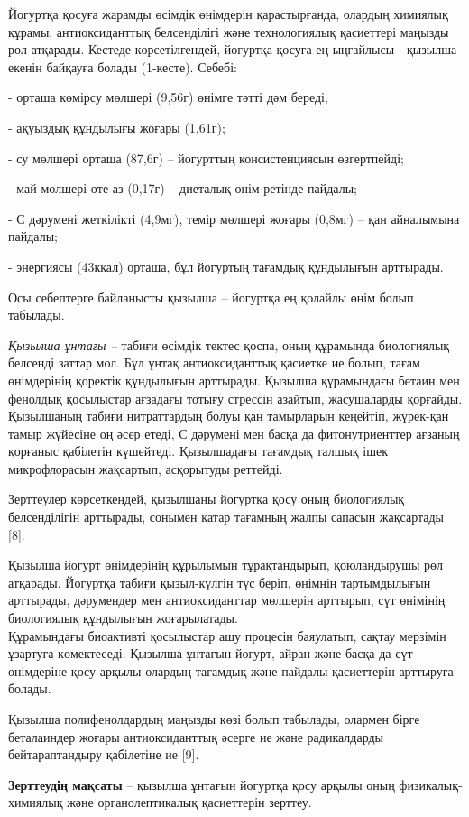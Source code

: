 \begin{multicols}{2}
Йогуртқа қосуға жарамды өсімдік өнімдерін қарастырғанда, олардың
химиялық құрамы, антиоксиданттық белсенділігі және технологиялық
қасиеттері маңызды рөл атқарады. Кестеде көрсетілгендей, йогуртқа қосуға
ең ыңғайлысы - қызылша екенін байқауға болады (1-кесте). Себебі:

- орташа көмірсу мөлшері (9,56г) өнімге тәтті дәм береді;

- ақуыздық құндылығы жоғары (1,61г);

- су мөлшері орташа (87,6г) -- йогурттың консистенциясын өзгертпейді;

- май мөлшері өте аз (0,17г) -- диеталық өнім ретінде пайдалы;

- С дәрумені жеткілікті (4,9мг), темір мөлшері жоғары (0,8мг) -- қан
айналымына пайдалы;

- энергиясы (43ккал) орташа, бұл йогуртың тағамдық құндылығын арттырады.

Осы себептерге байланысты қызылша -- йогуртқа ең қолайлы өнім болып
табылады.

\emph{Қызылша ұнтағы --} табиғи өсімдік тектес қоспа, оның құрамында
биологиялық белсенді заттар мол. Бұл ұнтақ антиоксиданттық қасиетке ие
болып, тағам өнімдерінің қоректік құндылығын арттырады. Қызылша
құрамындағы бетаин мен фенолдық қосылыстар ағзадағы тотығу стрессін
азайтып, жасушаларды қорғайды. Қызылшаның табиғи нитраттардың болуы қан
тамырларын кеңейтіп, жүрек-қан тамыр жүйесіне оң әсер етеді, С дәрумені
мен басқа да фитонутриенттер ағзаның қорғаныс қабілетін күшейтеді.
Қызылшадағы тағамдық талшық ішек микрофлорасын жақсартып, асқорытуды
реттейді.

Зерттеулер көрсеткендей, қызылшаны йогуртқа қосу оның биологиялық
белсенділігін арттырады, сонымен қатар тағамның жалпы сапасын
жақсартады\hspace{0pt} {[}8{]}.

Қызылша йогурт өнімдерінің құрылымын тұрақтандырып, қоюландырушы рөл
атқарады. Йогуртқа табиғи қызыл-күлгін түс беріп, өнімнің тартымдылығын
арттырады, дәрумендер мен антиоксиданттар мөлшерін арттырып, сүт
өнімінің биологиялық құндылығын жоғарылатады.\\
Құрамындағы биоактивті қосылыстар ашу процесін баяулатып, сақтау
мерзімін ұзартуға көмектеседі. Қызылша ұнтағын йогурт, айран және басқа
да сүт өнімдеріне қосу арқылы олардың тағамдық және пайдалы қасиеттерін
арттыруға болады.

Қызылша полифенолдардың маңызды көзі болып табылады, олармен бірге
беталаиндер жоғары антиоксиданттық әсерге ие және радикалдарды
бейтараптандыру қабілетіне ие {[}9{]}.

{\bfseries Зерттеудің мақсаты} -- қызылша ұнтағын йогуртқа қосу арқылы оның
физикалық-химиялық және органолептикалық қасиеттерін зерттеу.
\end{multicols}

